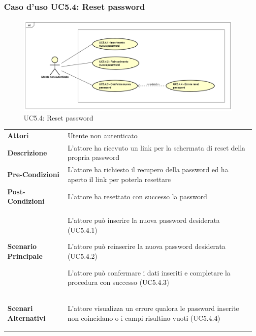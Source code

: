 \newpage
\subsubsection{Caso d'uso UC5.4: Reset password}
\label{UC5_4}
\begin{figure}[ht]
	\centering
	\includegraphics[scale=0.45]{UML/UC5_4.png}
	\caption{UC5.4: Reset password}
\end{figure}

\begin{minipage}{\linewidth}
	\begin{longtable}{ l | p{11cm}}
		\hline
		\rowcolor{Gray}
		\multicolumn{2}{c}{UC5.4 - Reset password} \\
		\hline
		\textbf{Attori} & Utente non autenticato \\
		\textbf{Descrizione} & L'attore ha ricevuto un link per la schermata di reset della propria password \\
		\textbf{Pre-Condizioni} & L'attore ha richiesto il recupero della password ed ha aperto il link per poterla resettare \\
		\textbf{Post-Condizioni} & L'attore ha resettato con successo la password \\
		\textbf{Scenario Principale} & 
		\begin{enumerate*}[label=(\arabic*.),itemjoin={\newline}]
			\item L'attore può inserire la nuova password desiderata (UC5.4.1)
			\item L'attore può reinserire la nuova password desiderata (UC5.4.2)
			\item L'attore può confermare i dati inseriti e completare la procedura con successo (UC5.4.3)
		\end{enumerate*}\\
		\textbf{Scenari Alternativi} & 
		\begin{enumerate*}[label=(\arabic*.),itemjoin={\newline}]
			\item L'attore visualizza un errore qualora le password inserite non coincidano o i campi risultino vuoti (UC5.4.4)
		\end{enumerate*}\\
	\end{longtable}
\end{minipage}

